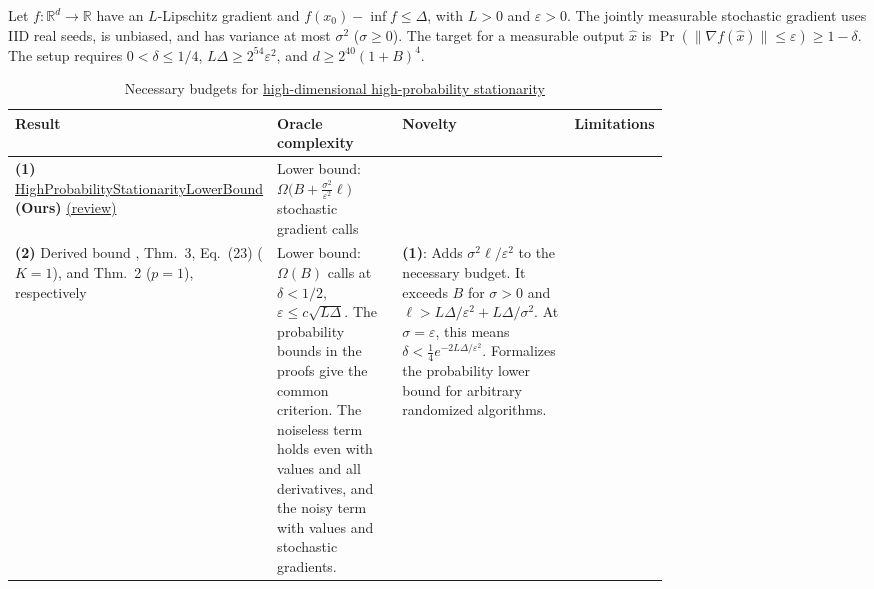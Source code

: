 \begin{table}[tp]
\centering
\caption{Necessary budgets for \href{https://github.com/k3nfalt/longtails/blob/main/LongTails/Setups/HighDimensionalHighProbabilityStationarity.lean}{high-dimensional high-probability stationarity}}\label{tab:HighDimensionalHighProbabilityStationarity}
\parbox{\linewidth}{\footnotesize
Let $f\colon\mathbb R^d\to\mathbb R$ have an $L$-Lipschitz gradient and $f(x_0)-\inf f\le\Delta$, with $L>0$ and $\varepsilon>0$. The jointly measurable stochastic gradient uses IID real seeds, is unbiased, and has variance at most $\sigma^2$ ($\sigma\ge0$). The target for a measurable output $\hat x$ is $\Pr(\|\nabla f(\hat x)\|\le\varepsilon)\ge1-\delta$. The setup requires $0<\delta\le1/4$, $L\Delta\ge 2^{54}\varepsilon^2$, and $d\ge 2^{40}(1+B)^4$.}
\par\smallskip
\begin{threeparttable}
\footnotesize
\setlength{\tabcolsep}{4pt}\renewcommand{\arraystretch}{1.25}
\begin{tabularx}{\linewidth}{@{}>{\raggedright\arraybackslash}p{0.22\linewidth}>{\raggedright\arraybackslash}p{0.24\linewidth}>{\raggedright\arraybackslash}p{0.30\linewidth}>{\raggedright\arraybackslash}X@{}}
\toprule
\textbf{Result} & \textbf{Oracle complexity} & \textbf{Novelty} & \textbf{Limitations} \\
\midrule
\textbf{(1)} \href{https://github.com/k3nfalt/longtails/blob/main/LongTails/Theorems/HighProbabilityStationarityLowerBound.lean}{High\allowbreak{}Probability\allowbreak{}Stationarity\allowbreak{}Lower\allowbreak{}Bound} \textbf{(Ours)} \href{https://github.com/k3nfalt/longtails/blob/main/scripts/reviews/HighProbabilityStationarityLowerBound.md}{(review)}
& Lower bound: $\Omega\bigl(B+\tfrac{\sigma^2}{\varepsilon^2}\ell\bigr)$ stochastic gradient calls
& & \\
\midrule[1.2pt]
\textbf{(2)} Derived bound \citep{hnnlArjevani2023V2,sncCarmon2020v3}, Thm.~3, Eq.~(23) ($K=1$), and Thm.~2 ($p=1$), respectively
& Lower bound: $\Omega(B)$ calls at $\delta<1/2$, $\varepsilon\le c\sqrt{L\Delta}$. The probability bounds in the proofs give the common criterion. The noiseless term holds even with values and all derivatives, and the noisy term with values and stochastic gradients.
& \textbf{(1)}: Adds $\sigma^2\ell/\varepsilon^2$ to the necessary budget. It exceeds $B$ for $\sigma>0$ and $\ell>L\Delta/\varepsilon^2+L\Delta/\sigma^2$. At $\sigma=\varepsilon$, this means $\delta<\tfrac14 e^{-2L\Delta/\varepsilon^2}$. Formalizes the probability lower bound for arbitrary randomized algorithms.

\end{tabularx}
\end{threeparttable}
\end{table}

